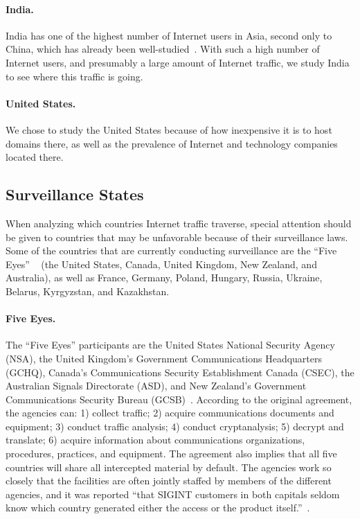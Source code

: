 \paragraph{India.}  India has one of the highest number of Internet users in Asia, second only to China, which has already been well-studied~\cite{tsui2003panopticon, wang2010discourse}.  With such a high number of Internet users, and presumably a large amount of Internet traffic, we study India to see where this traffic is going.

\paragraph{United States.}  We chose to study the United States because of how inexpensive it is to host domains there, as well as the prevalence of Internet and technology companies located there.

\subsection{Surveillance States}

When analyzing which countries Internet traffic traverse, special attention should be given to countries that may be unfavorable because of their surveillance laws.  Some of the countries that are currently conducting surveillance are the ``Five Eyes'' ~\cite{lander2004international, eyeswideopen} (the United States, Canada, United Kingdom, New Zealand, and Australia), as well as France, Germany, Poland, Hungary, Russia, Ukraine, Belarus, Kyrgyzstan, and Kazakhstan.  

\paragraph{Five Eyes.} The ``Five Eyes'' participants are the United States National Security Agency (NSA), the United Kingdom's Government Communications Headquarters (GCHQ), Canada's Communications Security Establishment Canada (CSEC), the Australian Signals Directorate (ASD), and New Zealand's Government Communications Security Bureau (GCSB)~\cite{eyeswideopen}.  According to the original agreement, the agencies can: 1) collect traffic; 2) acquire communications documents and equipment; 3) conduct traffic analysis; 4) conduct cryptanalysis; 5) decrypt and translate; 6) acquire information about communications organizations, procedures, practices, and equipment.  The agreement also implies that all five countries will share all intercepted material by default.  The agencies work so closely that the facilities are often jointly staffed by members of the different agencies, and it was reported ``that SIGINT customers in both capitals seldom know which country generated either the access or the product itself.''~\cite{lander2004international}.

